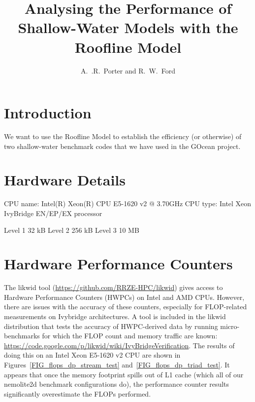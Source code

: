 \documentclass[12pt]{article}
\begin{document}
\title{Analysing the Performance of Shallow-Water Models with the
 Roofline Model}

\author{A.~.R.~Porter and R.~W.~Ford}

\maketitle

\section{Introduction}

We want to use the Roofline Model to establish the efficiency (or
otherwise) of two shallow-water benchmark codes that we have used in
the GOcean project.

\section{Hardware Details}

CPU name:       Intel(R) Xeon(R) CPU E5-1620 v2 @ 3.70GHz
CPU type:       Intel Xeon IvyBridge EN/EP/EX processor

Level 1 32 kB
Level 2 256 kB
Level 3 10 MB

\section{Hardware Performance Counters}

The likwid tool (\url{https://github.com/RRZE-HPC/likwid}) gives
access to Hardware Performance Counters (HWPCs) on Intel and AMD CPUs.
However, there are issues with the accuracy of these counters,
especially for FLOP-related measurements on Ivybridge architectures. A
tool is included in the likwid distribution that tests the accuracy of
HWPC-derived data by running micro-benchmarks for which the FLOP count
and memory traffic are known:
\url{https://code.google.com/p/likwid/wiki/IvyBridgeVerification}.
The results of doing this on an Intel Xeon E5-1620 v2 CPU are shown in
Figures~\ref{FIG_flops_dp_stream_test}
and~\ref{FIG_flops_dp_triad_test}. It appears that once the memory
footprint spills out of L1 cache (which all of our nemolite2d
benchmark configurations do), the performance counter results
significantly overestimate the FLOPs performed.
\end{document}
